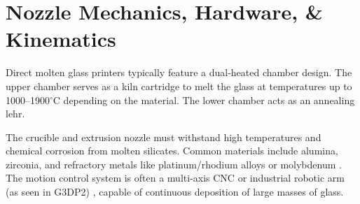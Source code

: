 \section{Nozzle Mechanics, Hardware, \& Kinematics}
Direct molten glass printers typically feature a dual-heated chamber design. The upper chamber serves as a kiln cartridge to melt the glass at temperatures up to 1000--1900$^\circ$C depending on the material. The lower chamber acts as an annealing lehr.

The crucible and extrusion nozzle must withstand high temperatures and chemical corrosion from molten silicates. Common materials include alumina, zirconia, and refractory metals like platinum/rhodium alloys or molybdenum \cite{klein2015additive}. The motion control system is often a multi-axis CNC or industrial robotic arm (as seen in G3DP2) \cite{inamura2018g3dp2}, capable of continuous deposition of large masses of glass.
